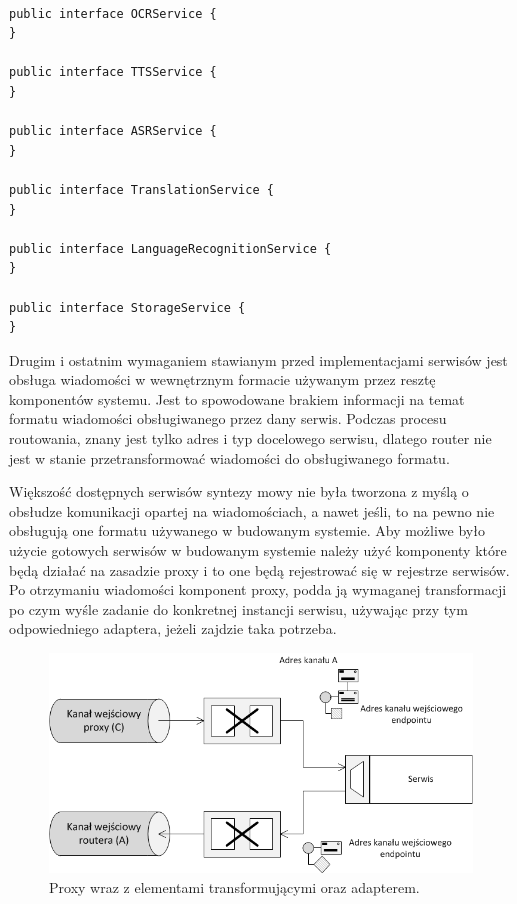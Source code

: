 \lstset{language=Java, tabsize=4, caption=Definicja interfejsów serwisów w języku Java.,label=lst:services_interfaces}

\begin{center}
\begin{lstlisting}

public interface OCRService {
}

public interface TTSService {
}

public interface ASRService {
}

public interface TranslationService {
}

public interface LanguageRecognitionService {
}

public interface StorageService {
}
\end{lstlisting}
\end{center}

Drugim i ostatnim wymaganiem stawianym przed implementacjami serwisów jest obsługa wiadomości w wewnętrznym formacie używanym przez resztę komponentów systemu. Jest to spowodowane brakiem informacji na temat formatu wiadomości obsługiwanego przez dany serwis. Podczas procesu routowania, znany jest tylko adres i typ docelowego serwisu, dlatego router nie jest w stanie przetransformować wiadomości do obsługiwanego formatu. 


Większość dostępnych serwisów syntezy mowy nie była tworzona z myślą o obsłudze komunikacji opartej na wiadomościach, a nawet jeśli, to na pewno nie obsługują one formatu używanego w budowanym systemie. Aby możliwe było użycie gotowych serwisów w budowanym systemie należy użyć komponenty które będą działać na zasadzie proxy i to one będą rejestrować się w rejestrze serwisów. Po otrzymaniu wiadomości komponent proxy, podda ją wymaganej transformacji po czym wyśle zadanie do konkretnej instancji serwisu, używając przy tym odpowiedniego adaptera, jeżeli zajdzie taka potrzeba. 

\begin{figure}[!h]
	\centering
	\includegraphics[scale=0.8]{proxy_layer_flow.png}
	\caption{Proxy wraz z elementami transformującymi oraz adapterem. }\label{fig:servis_proxy}
\end{figure}


